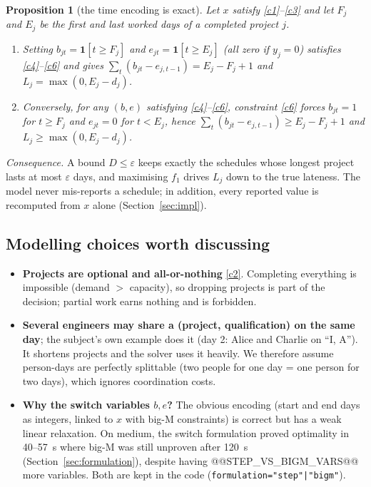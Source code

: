 \documentclass[11pt,a4paper]{article}
\theoremstyle{plain}
\newtheorem{proposition}{Proposition}
\newcommand{\eps}{\varepsilon}
\begin{document}
\begin{proposition}[the time encoding is exact]\label{prop:time}
Let $x$ satisfy \eqref{c1}--\eqref{c3} and let $F_j$ and $E_j$ be the first and last worked days of a completed project $j$.
\begin{enumerate}[label=(\roman*)]
  \item Setting $b_{jt}=\mathbf{1}[t\ge F_j]$ and $e_{jt}=\mathbf{1}[t\ge E_j]$ (all zero if $y_j=0$) satisfies \eqref{c4}--\eqref{c6} and gives $\sum_t(b_{jt}-e_{j,t-1})=E_j-F_j+1$ and $L_j=\max(0,E_j-d_j)$.
  \item Conversely, for any $(b,e)$ satisfying \eqref{c4}--\eqref{c6}, constraint \eqref{c6} forces $b_{jt}=1$ for $t\ge F_j$ and $e_{jt}=0$ for $t<E_j$, hence $\sum_t(b_{jt}-e_{j,t-1})\ge E_j-F_j+1$ and $L_j\ge\max(0,E_j-d_j)$.
\end{enumerate}
\end{proposition}

\noindent\textit{Consequence.} A bound $D\le\eps$ keeps exactly the schedules whose longest project lasts at most $\eps$ days, and maximising $f_1$ drives $L_j$ down to the true lateness. The model never mis-reports a schedule; in addition, every reported value is recomputed from $x$ alone (Section~\ref{sec:impl}).

\subsection{Modelling choices worth discussing}

\begin{itemize}
  \item \textbf{Projects are optional and all-or-nothing} \eqref{c2}. Completing everything is impossible (demand $>$ capacity), so dropping projects is part of the decision; partial work earns nothing and is forbidden.
  \item \textbf{Several engineers may share a (project, qualification) on the same day}; the subject's own example does it (day 2: Alice and Charlie on ``I, A''). It shortens projects and the solver uses it heavily. We therefore assume person-days are perfectly splittable (two people for one day = one person for two days), which ignores coordination costs.
  \item \textbf{Why the switch variables $b, e$?} The obvious encoding (start and end days as integers, linked to $x$ with big-M constraints) is correct but has a weak linear relaxation. On medium, the switch formulation proved optimality in 40--57~s where big-M was still unproven after 120~s (Section~\ref{sec:formulation}), despite having @@STEP_VS_BIGM_VARS@@ more variables. Both are kept in the code (\texttt{formulation="step"|"bigm"}).
\end{itemize}
\end{document}
